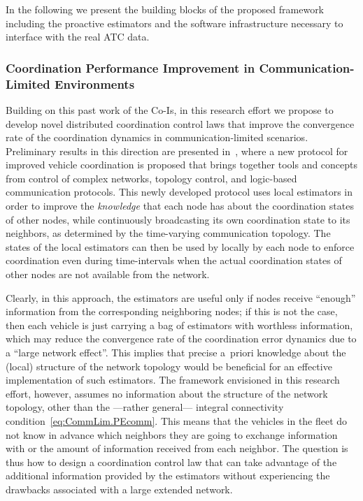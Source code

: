 \documentclass[letter,onecolumn,12pt]{aiaa-tc}
\newcommand{\1}{1_n}
\begin{document}
In the following we present the building blocks of the proposed framework including the proactive estimators and the software infrastructure necessary to interface with the real ATC data.

\subsubsection{Coordination Performance Improvement in Communication-Limited Environments}

Building on this past work of the Co-Is, in this research effort we propose to develop novel distributed coordination control laws that improve the convergence rate of the coordination dynamics in communication-limited scenarios. Preliminary results in this direction are presented in~\cite{XargayPhd}, where a new protocol for improved vehicle coordination is proposed that brings together tools and concepts from control of complex networks, topology control, and logic-based communication protocols. This newly developed protocol uses local estimators in order to improve the \emph{knowledge} that each node has about the coordination states of other nodes, while continuously broadcasting its own coordination state to its neighbors, as determined by the time-varying communication topology. The states of the local estimators can then be used by locally by each node to enforce coordination even during time-intervals when the actual coordination states of other nodes are not available from the network.


Clearly, in this approach, the estimators are useful only if nodes receive ``enough'' information from the corresponding neighboring nodes; if this is not the case, then each vehicle is just carrying a bag of estimators with worthless information, which may reduce the convergence rate of the coordination error dynamics due to a ``large network effect''. This implies that precise a~priori knowledge about the (local) structure of the network topology would be beneficial for an effective implementation of such estimators. The framework envisioned in this research effort, however, assumes no information about the structure of the network topology, other than the ---rather general--- integral connectivity condition~\eqref{eq:CommLim.PEcomm}. This means that the vehicles in the fleet do not know in advance which neighbors they are going to exchange information with or the amount of information received from each neighbor. The question is thus how to design a coordination control law that can take advantage of the additional information provided by the estimators without experiencing the drawbacks associated with a large extended network.
\end{document}
